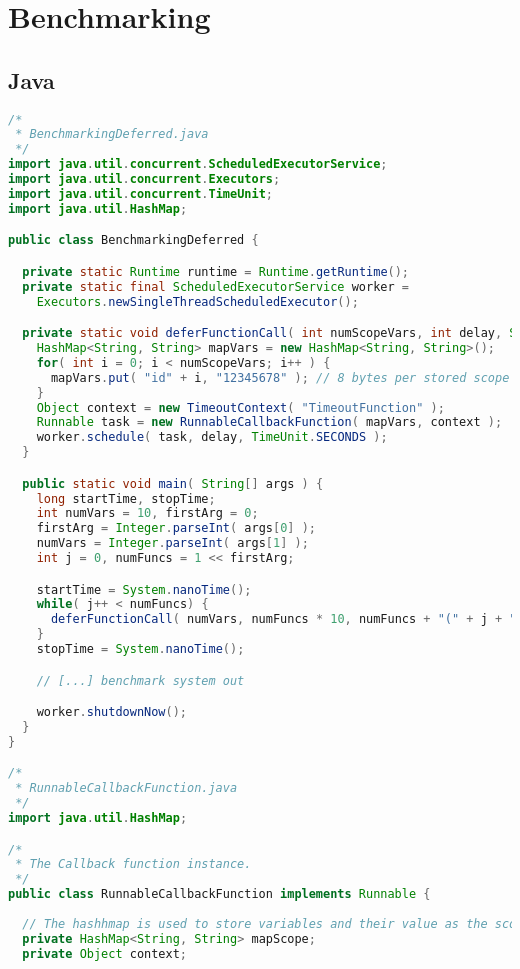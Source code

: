 
\chapter{Benchmarking}
\section{Java}

\begin{lstlisting}[nolol,label=lst_bm_java,language=Java,caption=Closure Benchmarking: Java Code]
/*
 * BenchmarkingDeferred.java
 */
import java.util.concurrent.ScheduledExecutorService;
import java.util.concurrent.Executors;
import java.util.concurrent.TimeUnit;
import java.util.HashMap;

public class BenchmarkingDeferred {

  private static Runtime runtime = Runtime.getRuntime();
  private static final ScheduledExecutorService worker = 
    Executors.newSingleThreadScheduledExecutor();

  private static void deferFunctionCall( int numScopeVars, int delay, String scopeId ) {
    HashMap<String, String> mapVars = new HashMap<String, String>();
    for( int i = 0; i < numScopeVars; i++ ) {
      mapVars.put( "id" + i, "12345678" ); // 8 bytes per stored scope variable
    }
    Object context = new TimeoutContext( "TimeoutFunction" );
    Runnable task = new RunnableCallbackFunction( mapVars, context );
    worker.schedule( task, delay, TimeUnit.SECONDS );
  }

  public static void main( String[] args ) {
    long startTime, stopTime;
    int numVars = 10, firstArg = 0;
    firstArg = Integer.parseInt( args[0] );
    numVars = Integer.parseInt( args[1] );
    int j = 0, numFuncs = 1 << firstArg;

    startTime = System.nanoTime();
    while( j++ < numFuncs) {
      deferFunctionCall( numVars, numFuncs * 10, numFuncs + "(" + j + ")" );
    }
    stopTime = System.nanoTime();

    // [...] benchmark system out

    worker.shutdownNow();
  }
}

/*
 * RunnableCallbackFunction.java
 */
import java.util.HashMap;

/*
 * The Callback function instance.
 */
public class RunnableCallbackFunction implements Runnable {
  
  // The hashhmap is used to store variables and their value as the scope
  private HashMap<String, String> mapScope;
  private Object context;


\end{lstlisting}
